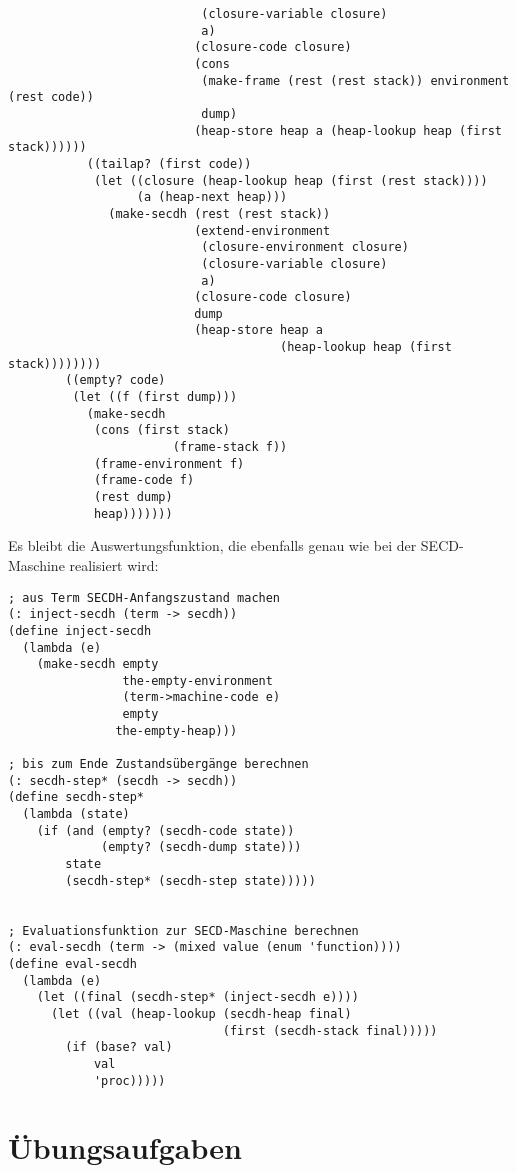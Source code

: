 \begin{verbatim}
                           (closure-variable closure)
                           a)
                          (closure-code closure)
                          (cons
                           (make-frame (rest (rest stack)) environment (rest code))
                           dump)
                          (heap-store heap a (heap-lookup heap (first stack))))))
           ((tailap? (first code))
            (let ((closure (heap-lookup heap (first (rest stack))))
                  (a (heap-next heap)))
              (make-secdh (rest (rest stack))
                          (extend-environment
                           (closure-environment closure)
                           (closure-variable closure)
                           a)
                          (closure-code closure)
                          dump
                          (heap-store heap a
                                      (heap-lookup heap (first stack))))))))
        ((empty? code)
         (let ((f (first dump)))
           (make-secdh
            (cons (first stack)
                       (frame-stack f))
            (frame-environment f)
            (frame-code f)
            (rest dump)
            heap)))))))
\end{verbatim}    
%
Es bleibt die Auswertungsfunktion, die ebenfalls genau wie bei der
SECD-Maschine realisiert wird:
%
\begin{verbatim}
; aus Term SECDH-Anfangszustand machen
(: inject-secdh (term -> secdh))
(define inject-secdh
  (lambda (e)
    (make-secdh empty
                the-empty-environment
                (term->machine-code e)
                empty
               the-empty-heap)))

; bis zum Ende Zustandsübergänge berechnen
(: secdh-step* (secdh -> secdh))
(define secdh-step*
  (lambda (state)
    (if (and (empty? (secdh-code state))
             (empty? (secdh-dump state)))
        state
        (secdh-step* (secdh-step state)))))


; Evaluationsfunktion zur SECD-Maschine berechnen
(: eval-secdh (term -> (mixed value (enum 'function))))
(define eval-secdh
  (lambda (e)
    (let ((final (secdh-step* (inject-secdh e))))
      (let ((val (heap-lookup (secdh-heap final)
                              (first (secdh-stack final)))))
        (if (base? val)
            val
            'proc)))))
\end{verbatim}


\section*{Übungsaufgaben}

